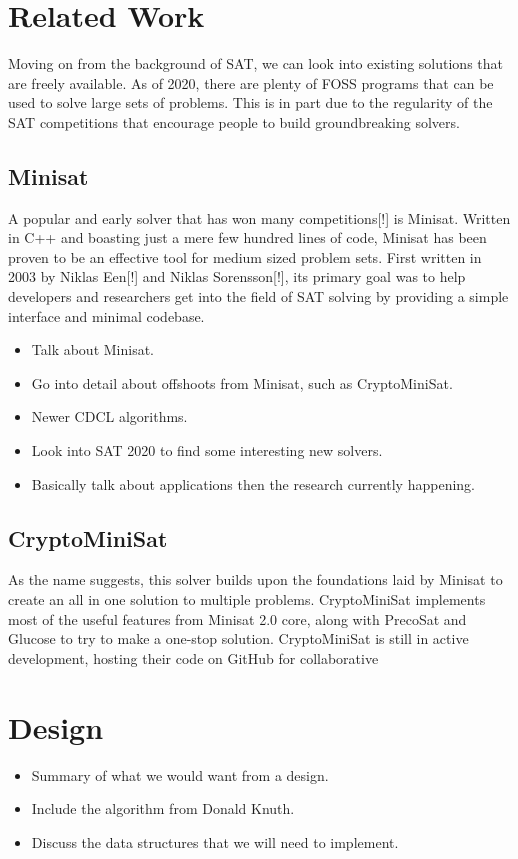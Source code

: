 \documentclass{article}
\begin{document}
\section{Related Work}
Moving on from the background of SAT, we can look into existing solutions that are freely available.
As of 2020, there are plenty of FOSS programs that can be used to solve large sets of problems. This
is in part due to the regularity of the SAT competitions that encourage people to build
groundbreaking solvers.

\subsection{Minisat}
A popular and early solver that has won many competitions[!] is Minisat. Written in C++ and boasting
just a mere few hundred lines of code, Minisat has been proven to be an effective tool for medium
sized problem sets. First written in 2003 by Niklas Een[!] and Niklas Sorensson[!], its primary goal
was to help developers and researchers get into the field of SAT solving by providing a simple
interface and minimal codebase.

\begin{itemize}
    \item Talk about Minisat.
    \item Go into detail about offshoots from Minisat, such as CryptoMiniSat.
    \item Newer CDCL algorithms.
    \item Look into SAT 2020 to find some interesting new solvers.
    \item Basically talk about applications then the research currently happening.
\end{itemize}

\subsection{CryptoMiniSat}
As the name suggests, this solver builds upon the foundations laid by Minisat to create an all in
one solution to multiple problems. CryptoMiniSat implements most of the useful features from Minisat
2.0 core, along with PrecoSat and Glucose to try to make a one-stop solution. CryptoMiniSat is still
in active development, hosting their code on GitHub for collaborative

\section{Design}
\begin{itemize}
    \item Summary of what we would want from a design.
    \item Include the algorithm from Donald Knuth.
    \item Discuss the data structures that we will need to implement.
\end{itemize}
\end{document}
